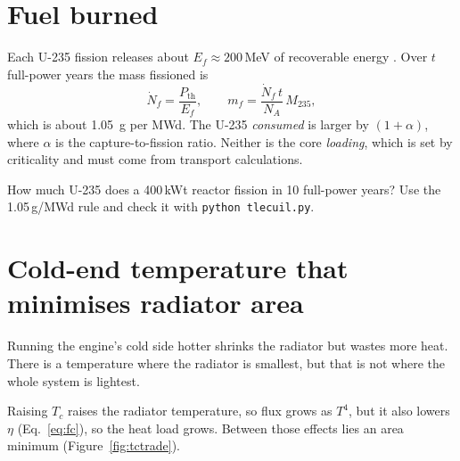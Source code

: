 \documentclass[11pt]{article}
\numberwithin{equation}{section}
\numberwithin{table}{section}
\newcommand{\Pth}{P_\text{th}}
\begin{document}
\section{Fuel burned}\label{sec:fuel}
Each U-235 fission releases about $E_f\approx200$\,MeV of recoverable energy
\cite{lamarsh2017}. Over $t$ full-power years the mass fissioned is
\begin{equation}
  \dot N_f = \frac{\Pth}{E_f}, \qquad m_f = \frac{\dot N_f\,t}{N_A}\,M_{235},
  \label{eq:mf}
\end{equation}
which is about \SI{1.05}{g} per MWd. The U-235 \emph{consumed} is larger by
$(1+\alpha)$, where $\alpha$ is the capture-to-fission ratio. Neither is the core
\emph{loading}, which is set by criticality and must come from transport
calculations.

\begin{tryit}[label=try:fuel]
How much U-235 does a 400\,kWt reactor fission in 10 full-power years? Use the
1.05\,g/MWd rule and check it with \texttt{python tlecuil.py}.
\end{tryit}

\section{Cold-end temperature that minimises radiator area}\label{sec:opt}
\begin{keyidea}
Running the engine's cold side hotter shrinks the radiator but wastes more heat. There is
a temperature where the radiator is smallest, but that is not where the whole system is
lightest.
\end{keyidea}

Raising $T_c$ raises the radiator temperature, so flux grows as $T^4$, but it also
lowers $\eta$ (Eq.~\eqref{eq:fc}), so the heat load grows. Between those effects lies
an area minimum (Figure~\ref{fig:tctrade}).
\end{document}
